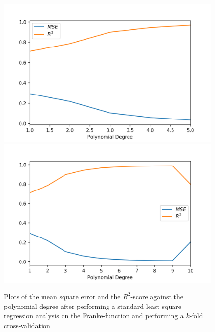 \documentclass[a4paper,10pt,english]{article}
\begin{document}
\begin{figure}[H]
	\centering 
	\includegraphics[scale=0.63]{../franke_output/part_B.png}
	\includegraphics[scale=0.63]{../franke_output/part_B_highdeg.png}
	\caption{
		Plots of the mean square error and the $R^2$-score against the polynomial degree after performing a standard least square regression analysis on the Franke-function and performing a $k$-fold cross-validation
	}
	\label{part_b}
\end{figure}
\end{document}
